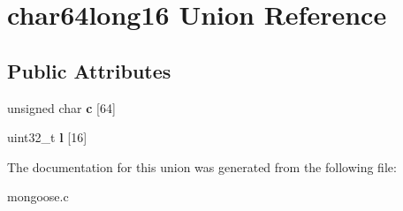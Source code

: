 \hypertarget{unionchar64long16}{\section{char64long16 Union Reference}
\label{unionchar64long16}
}
\subsection*{Public Attributes}
\begin{DoxyCompactItemize}
\item 
\hypertarget{unionchar64long16_a7067dbe3b0ff3f11661acb8cd97bcff9}{unsigned char {\bfseries c} \mbox{[}64\mbox{]}}\label{unionchar64long16_a7067dbe3b0ff3f11661acb8cd97bcff9}

\item 
\hypertarget{unionchar64long16_a4f1edebae3468a551ff2d0cdaecb467d}{uint32\-\_\-t {\bfseries l} \mbox{[}16\mbox{]}}\label{unionchar64long16_a4f1edebae3468a551ff2d0cdaecb467d}

\end{DoxyCompactItemize}


The documentation for this union was generated from the following file\-:\begin{DoxyCompactItemize}
\item 
mongoose.\-c\end{DoxyCompactItemize}
